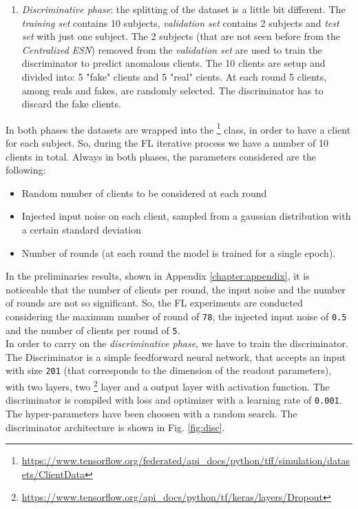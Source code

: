 {{{\begin{enumerate}
    \item \textit{Discriminative phase}: the splitting of the dataset is a little bit different. The \textit{training set} contains 10 subjects, \textit{validation set} contains 2 subjects and \textit{test set} with just one subject. The 2 subjects (that are not seen before from the \textit{Centralized ESN}) removed from the \textit{validation set} are used to train the discriminator to predict anomalous clients. The 10 clients are setup and divided into: 5 "fake" clients and 5 "real" cients. At each round 5 clients, among reals and fakes, are randomly selected. The discriminator has to discard the fake clients.
\end{enumerate}

In both phases the datasets are wrapped into the \footnote{\url{https://www.tensorflow.org/federated/api_docs/python/tff/simulation/datasets/ClientData}} class, in order to have a client for each subject. So, during the FL iterative process we have a number of 10 clients in total. Always in both phases, the parameters considered are the following:

\begin{itemize}
    \item Random number of clients to be considered at each round
    \item Injected input noise on each client, sampled from a gaussian distribution with a certain standard deviation
    \item Number of rounds (at each round the model is trained for a single epoch).
\end{itemize}

In the preliminaries results, shown in Appendix \ref{chapter:appendix}, it is noticeable that the number of clients per round, the input noise and the number of rounds are not so significant. So, the FL experiments are conducted considering the maximum number of round of \texttt{78}, the injected input noise of \texttt{0.5} and the number of clients per round of \texttt{5}. \\

In order to carry on the \textit{discriminative phase}, we have to train the discriminator. The Discriminator is a simple feedforward neural network, that accepts an input with size \texttt{201} (that corresponds to the dimension of the readout parameters), with two  layers, two \footnote{\url{https://www.tensorflow.org/api_docs/python/tf/keras/layers/Dropout}} layer and a  output layer with  activation function. The discriminator is compiled with  loss and  optimizer with a learning rate of \texttt{0.001}. The hyper-parameters have been choosen with a random search. The discriminator architecture is shown in Fig. \ref{fig:disc}.

}}}
